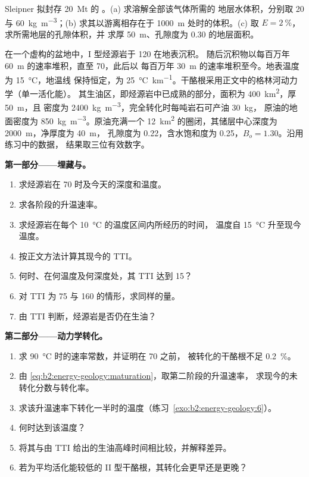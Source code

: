 \begin{exercise}[$\star\star\star$]\label{exo:b2:energy-geology:12}
Sleipner 拟封存 \qty{20}{Mt} 的 。(a) 求溶解全部该气体所需的
地层水体积，分别取 20 与 \qty{60}{kg.m^{-3}}；(b) 求其以游离相存在于
\qty{1000}{m} 处时的体积。(c) 取 $E = \qty{2}{\percent}$，求所需地层的孔隙体积，并
求厚 \qty{50}{m}、孔隙度为 0.30 的地层面积。
\end{exercise}

\begin{problem}\label{pb:b2:energy-geology:1}
在一个虚构的盆地中，I 型烃源岩于 \qty{120}{\Ma} 在地表沉积。
随后沉积物以每百万年 \qty{60}{m} 的速率堆积，直至 \qty{70}{\Ma}，此后以
每百万年 \qty{30}{m} 的速率堆积至今。地表温度为 \qty{15}{\celsius}，地温线
保持恒定，为 \qty{25}{\celsius\per\km}。干酪根采用正文中的格林河动力学（单一活化能）。
其生油区，即烃源岩中已成熟的部分，面积为 \qty{400}{km^2}，厚 \qty{50}{m}，且
密度为 \qty{2400}{kg.m^{-3}}，完全转化时每吨岩石可产油 \qty{30}{kg}，
原油的地面密度为 \qty{850}{kg.m^{-3}}。原油充满一个
\qty{12}{km^2} 的圈闭，其储层中心深度为 \qty{2000}{m}，净厚度为 \qty{40}{m}，
孔隙度为 0.22，含水饱和度为 0.25，$B_o = 1.30$。沿用练习中的数据，
结果取三位有效数字。

\noindent\textbf{第一部分——埋藏与。}
\begin{enumerate}
  \item 求烃源岩在 \qty{70}{\Ma} 时及今天的深度和温度。
  \item 求各阶段的升温速率。
  \item 求烃源岩在每个 \qty{10}{\celsius} 的温度区间内所经历的时间，
        温度自 \qty{15}{\celsius} 升至现今温度。
  \item 按正文方法计算其现今的 TTI。
  \item 何时、在何温度及何深度处，其 TTI 达到 15？
  \item 对 TTI 为 75 与 160 的情形，求同样的量。
  \item 由 TTI 判断，烃源岩是否仍在生油？
\end{enumerate}

\noindent\textbf{第二部分——动力学转化。}
\begin{enumerate}[resume]
  \item 求 \qty{90}{\celsius} 时的速率常数，并证明在 \qty{70}{\Ma} 之前，
        被转化的干酪根不足 \qty{0.2}{\percent}。
  \item 由 \eqref{eq:b2:energy-geology:maturation}，取第二阶段的升温速率，
        求现今的未转化分数与转化率。
  \item 求该升温速率下转化一半时的温度（练习~\ref{exo:b2:energy-geology:6}）。
  \item 何时达到该温度？
  \item 将其与由 TTI 给出的生油高峰时间相比较，并解释差异。
  \item 若为平均活化能较低的 II 型干酪根，其转化会更早还是更晚？
\end{enumerate}


\end{problem}
